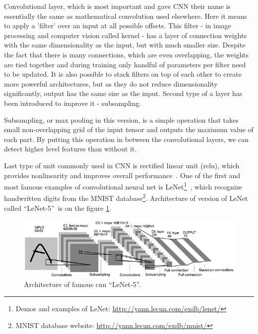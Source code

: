 Convolutional layer, which is most important and gave CNN their name is essentially the same as mathematical convolution used elsewhere. Here it means to apply a 'filter' over an input at all possible offsets. This filter - in image processing and computer vision called kernel - has a layer of connection weights with the same dimensionality as the input, but with much smaller size. Despite the fact that there is many connections, which are even overlapping, the weights are tied together and during training only handful of parameters per filter need to be updated. It is also possible to stack filters on top of each other to create more powerful architectures, but as they do not reduce dimensionality significantly, output has the same size as the input. Second type of a layer has been introduced to improve it - subsampling.

Subsampling, or max pooling in this version, is a simple operation that takes small non-overlapping grid of the input tensor and outputs the maximum value of each part. By putting this operation in between the convolutional layers, we can detect higher level features than without it.

Last type of unit commonly used in CNN is rectified linear unit (\gls{relu}), which provides nonlinearity and improves overall performance~\cite{jarrett-iccv-09, DBLP:conf/icml/NairH10}. One of the first and most famous examples of convolutional neural net is LeNet\footnote{Demos and examples of LeNet: \url{http://yann.lecun.com/exdb/lenet/}}~\cite{lecun-98}, which recognize handwritten digits from the MNIST database\footnote{MNIST database website: \url{http://yann.lecun.com/exdb/mnist/}}. Architecture of version of LeNet called \textquotedblleft LeNet-5\textquotedblright\ is on the figure \ref{fig:lenet}.

\begin{figure}[!t]
	\centering
	\includegraphics[width=\textwidth]{./fig/lenet-architecture.png}
	\caption{Architecture of famous \gls{cnn} \textquotedblleft LeNet-5\textquotedblright.~\cite{lecun-98}
		\label{fig:lenet}}
\end{figure}

